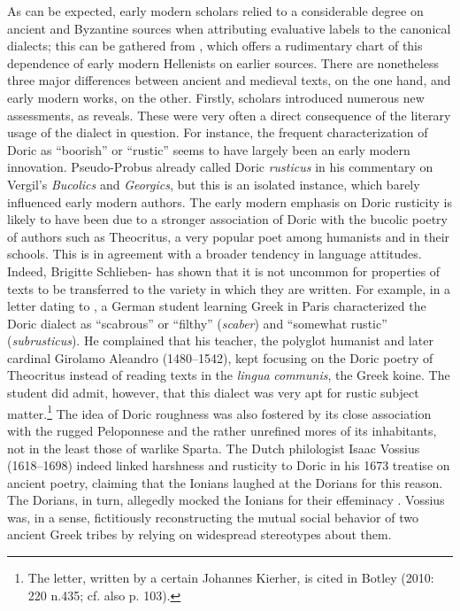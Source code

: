 \documentclass[output=paper]{langsci/langscibook}
\begin{document}
As can be expected, early modern scholars relied to a considerable degree on ancient and Byzantine sources when attributing evaluative labels to the canonical dialects; this can be gathered from , which offers a rudimentary chart of this dependence of early modern Hellenists on earlier sources. There are nonetheless three major differences between ancient and medieval texts, on the one hand, and early modern works, on the other. Firstly, scholars introduced numerous new assessments, as  reveals. These were very often a direct consequence of the literary usage of the dialect in question. For instance, the frequent characterization of Doric as “boorish” or “rustic” seems to have largely been an early modern innovation. Pseudo-Probus already called Doric \textit{rusticus} in his commentary on Vergil’s \textit{Bucolics} and \textit{Georgics}, but this is an isolated instance, which barely influenced early modern authors. The early modern emphasis on Doric rusticity is likely to have been due to a stronger association of Doric with the bucolic poetry of authors such as Theocritus, a very popular poet among humanists and in their schools. This is in agreement with a broader tendency in language attitudes. Indeed, Brigitte Schlieben-\citet{Lange1992} has shown that it is not uncommon for properties of texts to be transferred to the variety in which they are written. For example, in a letter dating to \citealt{November1511}, a German student learning Greek in Paris characterized the Doric dialect as “scabrous” or “filthy” (\textit{scaber}) and “somewhat rustic” (\textit{subrusticus}). He complained that his teacher, the polyglot humanist and later cardinal Girolamo Aleandro (1480–1542), kept focusing on the Doric poetry of Theocritus instead of reading texts in the \textit{lingua} \textit{communis}, the Greek koine. The student did admit, however, that this dialect was very apt for rustic subject matter.\footnote{The letter, written by a certain Johannes Kierher, is cited in Botley (2010: 220 n.435; cf. also p. 103).} The idea of Doric roughness was also fostered by its close association with the rugged Peloponnese and the rather unrefined mores of its inhabitants, not in the least those of warlike Sparta. The Dutch philologist Isaac Vossius (1618–1698) indeed linked harshness and rusticity to Doric in his 1673 treatise on ancient poetry, claiming that the Ionians laughed at the Dorians for this reason. The Dorians, in turn, allegedly mocked the Ionians for their effeminacy \citep[55]{Vossius1673}. Vossius was, in a sense, fictitiously reconstructing the mutual social behavior of two ancient Greek tribes by relying on widespread stereotypes about them.
\end{document}
